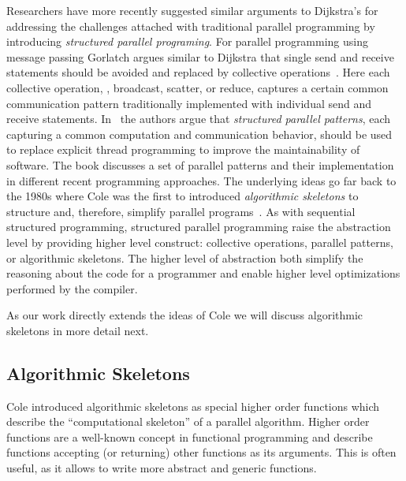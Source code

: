 Researchers have more recently suggested similar arguments to Dijkstra's for addressing the challenges attached with traditional parallel programming by introducing \emph{structured parallel programing}.
For parallel programming using message passing Gorlatch argues similar to Dijkstra that single send and receive statements should be avoided and replaced by collective operations~\cite{Gorlatch04}.
Here each collective operation, \eg, broadcast, scatter, or reduce, captures a certain common communication pattern traditionally implemented with individual send and receive statements.
In~\cite{McCoolRoRe2012} the authors argue that \emph{structured parallel patterns}, each capturing a common computation and communication behavior, should be used to replace explicit thread programming to improve the maintainability of software.
The book discusses a set of parallel patterns and their implementation in different recent programming approaches.
The underlying ideas go far back to the 1980s where Cole was the first to introduced \emph{algorithmic skeletons} to structure and, therefore, simplify parallel programs~\cite{Cole1991}.
As with sequential structured programming, structured parallel programming raise the abstraction level by providing higher level construct: collective operations, parallel patterns, or algorithmic skeletons.
The higher level of abstraction both simplify the reasoning about the code for a programmer and enable higher level optimizations performed by the compiler.

As our work directly extends the ideas of Cole we will discuss algorithmic skeletons in more detail next.

\subsection{Algorithmic Skeletons}
Cole introduced algorithmic skeletons as special higher order functions which describe the ``computational skeleton'' of a parallel algorithm.
Higher order functions are a well-known concept in functional programming and describe functions accepting (or returning) other functions as its arguments.
This is often useful, as it allows to write more abstract and generic functions.


